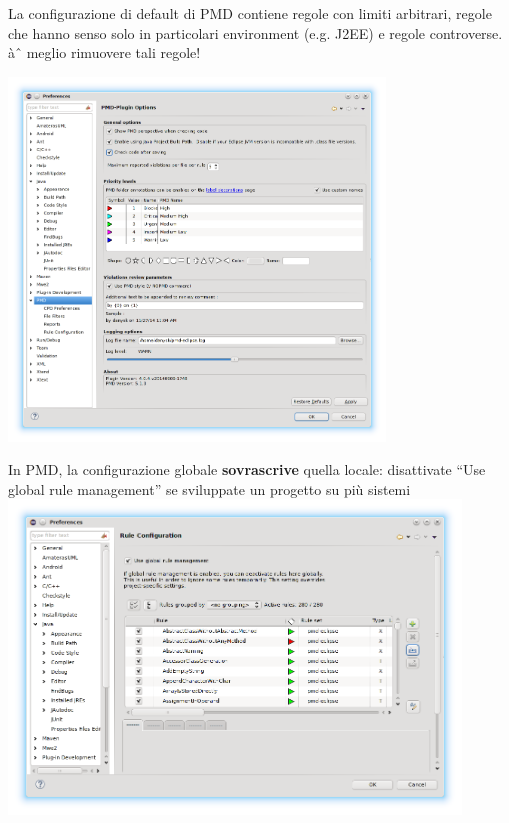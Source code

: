 \documentclass[presentation]{beamer}
\begin{document}
 {
	La configurazione di default di PMD contiene regole con limiti arbitrari, regole che hanno senso solo in particolari environment (e.g. J2EE) e regole controverse. àˆ meglio rimuovere tali regole!
}

 {
	\centering
	\includegraphics[width=0.75\textwidth]{img/pmdconf}
}

 {
  In PMD, la configurazione globale \textbf{sovrascrive} quella locale: disattivate ``Use global rule management'' se sviluppate un progetto su più sistemi
  \centering
  \includegraphics[width=0.9\textwidth]{img/pmdconf1}
}
\end{document}
